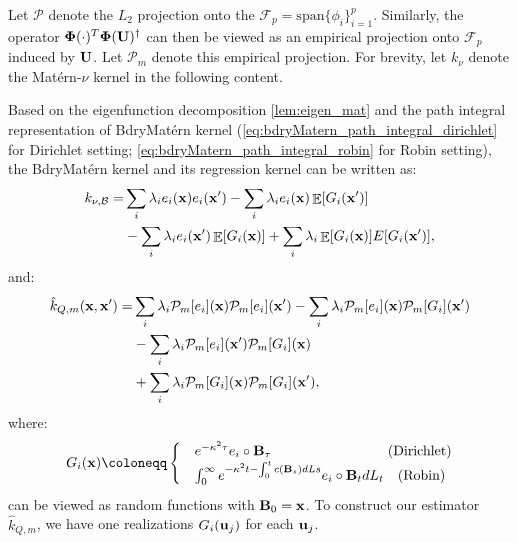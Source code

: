 \documentclass[aos,preprint]{imsart}
\theoremstyle{plain}
\DeclareMathOperator{\E}{\mathbb E}
\newcommand{\CalP}{\mathcal P}
\newcommand{\Bx}{\bold x}
\newcommand{\BFx}{\bold x}
\newcommand{\BB}{\bold B}
\newcommand{\BU}{\bold U}
\newcommand{\Bu}{\bold u}
\newcommand{\BPhi}{\boldsymbol{\Phi}}
\newcommand{\CalF}{\mathcal{F}}
\theoremstyle{remark}
\begin{document}
\begin{appendix}
Let $\CalP$ denote the $L_2$ projection onto the $\CalF_p=\text{span}\{\phi_i\}_{i=1}^p$. Similarly,
 the operator $\BPhi(\cdot)^T\BPhi(\BU)^\dagger$ can then be viewed as an empirical projection onto  $\CalF_p$ induced by $\BU$. Let $\CalP_m$ denote this empirical projection. For brevity, let $k_{\nu}$ denote the Mat\'ern-$\nu$ kernel in the following content.
 
 Based on the eigenfunction decomposition \eqref{lem:eigen_mat} and the path integral representation of BdryMat\'ern kernel (\eqref{eq:bdryMatern_path_integral_dirichlet} for Dirichlet setting; \eqref{eq:bdryMatern_path_integral_robin} for Robin setting), the BdryMat\'ern kernel and its regression kernel can be written as:
 \begin{align}
      k_{\nu,\mathcal{B}}=&\sum_i\lambda_ie_i(\BFx)e_i(\BFx')-\sum_i\lambda_ie_i(\Bx)\E[G_i(\BFx')]\nonumber\\
     &-\sum_i\lambda_ie_i(\Bx')\E[G_i(\Bx)]+\sum_i\lambda_i\E[G_i(\Bx)]E[G_i(\Bx')],\label{eq_pf_general_convergence_1}
 \end{align}
 and:
 \begin{align}
     \hat{k}_{Q,m}(\Bx,\Bx')=&\sum_i\lambda_i\CalP_m[e_i](\BFx)\CalP_m[e_i](\BFx')-\sum_i\lambda_i\CalP_m[e_i](\Bx)\CalP_m[G_i](\BFx')\nonumber\\
     &-\sum_i\lambda_i\CalP_m[e_i](\Bx')\CalP_m[G_i](\BFx)\nonumber\\
     &+\sum_i\lambda_i\CalP_m[G_i](\Bx)\CalP_m[G_i](\BFx'),\label{eq_pf_general_convergence_2}
 \end{align}
where:
\begin{equation*}
    G_i(\BFx)\coloneqq\begin{cases}
        &e^{-\kappa^2\tau} e_i\circ \BB_\tau\quad \quad \quad \quad \quad \quad \quad \quad \ \text{(Dirichlet)}\\
        & \int_0^\infty e^{-\kappa^2t-\int_0^tc(\BB_s)dLs}e_i\circ\BB_t dL_t\quad \text{(Robin)} 
    \end{cases}
\end{equation*}
 can be viewed as  random functions with $\BB_0=\BFx$. To construct our estimator $\hat{k}_{Q,m}$, we have one realizations $G_{i}(\Bu_j)$ for each $\Bu_j$. %

\end{appendix}
\end{document}
